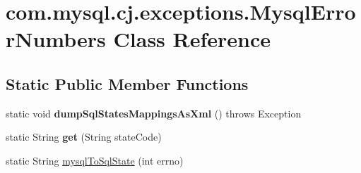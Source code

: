 \hypertarget{classcom_1_1mysql_1_1cj_1_1exceptions_1_1_mysql_error_numbers}{}\section{com.\+mysql.\+cj.\+exceptions.\+Mysql\+Error\+Numbers Class Reference}
\label{classcom_1_1mysql_1_1cj_1_1exceptions_1_1_mysql_error_numbers}
\subsection*{Static Public Member Functions}
\begin{DoxyCompactItemize}
\item 
\mbox{\label{classcom_1_1mysql_1_1cj_1_1exceptions_1_1_mysql_error_numbers_ac2f064106bc066c3426ab86e6c8361f7}} 
static void {\bfseries dump\+Sql\+States\+Mappings\+As\+Xml} ()  throws Exception 
\item 
\mbox{\label{classcom_1_1mysql_1_1cj_1_1exceptions_1_1_mysql_error_numbers_a1594039517c9f55d0d15dc3c8054de2d}} 
static String {\bfseries get} (String state\+Code)
\item 
static String \mbox{\hyperlink{classcom_1_1mysql_1_1cj_1_1exceptions_1_1_mysql_error_numbers_ad2b67380d5de823e5596826679ba55bc}{mysql\+To\+Sql\+State}} (int errno)
\end{DoxyCompactItemize}
